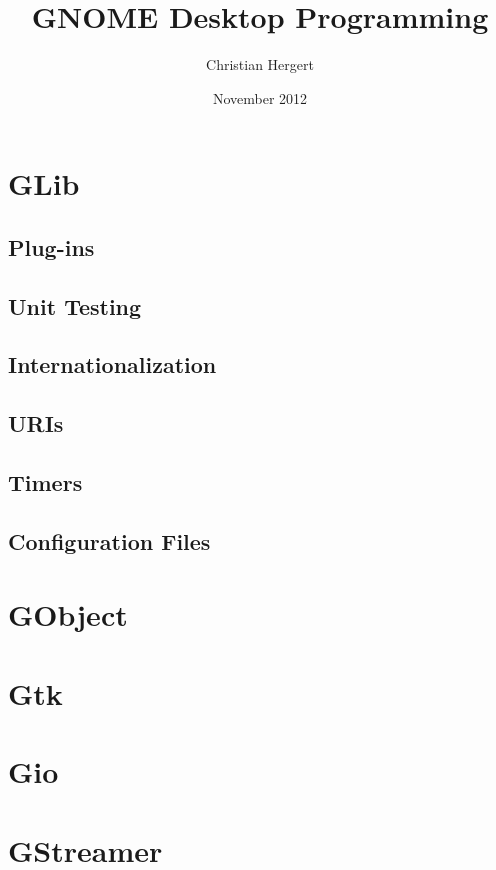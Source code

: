 

\title{
    GNOME Desktop Programming
}
\author{Christian Hergert}
\date{November 2012}

\frontmatter
\maketitle
\tableofcontents


\mainmatter
\part{GLib}










\chapter{Plug-ins}


\chapter{Unit Testing}
\chapter{Internationalization}
\chapter{URIs}
\chapter{Timers}
\chapter{Configuration Files}
\part{GObject}
\part{Gtk}
\part{Gio}
\part{GStreamer}
\appendix

